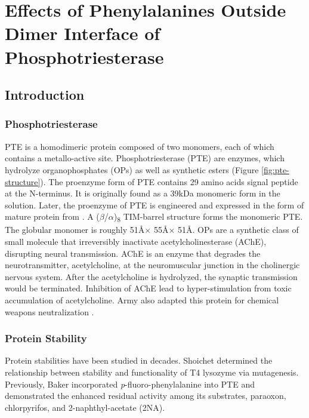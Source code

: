 \chapter{Effects of Phenylalanines Outside Dimer Interface of Phosphotriesterase}
\label{chap:dimer}
\begin{refsection}

\section{Introduction}

\subsection{Phosphotriesterase}

PTE is a homodimeric protein composed of two monomers, each of which contains a
metallo-active site. Phosphotriesterase (PTE) are enzymes, which hydrolyze
organophosphates (OPs) as well as synthetic esters (Figure
\ref{fig:pte-structure})\cite{Ghanem2005a}. The proenzyme form of PTE contains
29 amino acids signal peptide at the N-terminus. It is originally found as a
39kDa monomeric form in the solution\cite{Mulbry1989}. Later, the proenzyme of
PTE is engineered and expressed in the form of mature protein from . A ($\beta$/$\alpha$)\textsubscript{8} TIM-barrel structure forms the
monomeric PTE\cite{Roodveldt2005,Seibert2005}. The globular monomer is roughly
51\AA $\times$ 55\AA $\times$ 51\AA.  OPs are a synthetic class of small
molecule that irreversibly inactivate acetylcholinesterase (AChE), disrupting
neural transmission. AChE is an enzyme that degrades the neurotransmitter,
acetylcholine, at the neuromuscular junction in the cholinergic nervous system.
After the acetylcholine is hydrolyzed, the synaptic transmission would be
terminated. Inhibition of AChE lead to hyper-stimulation from toxic
accumulation of acetylcholine\cite{Soreq2001}. Army also adapted this protein
for chemical weapons neutralization \cite{Yang2014a}.

\subsection{Protein Stability}

Protein stabilities have been studied in decades. Shoichet 
determined the relationship between stability and functionality of T4 lysozyme
via mutagenesis\cite{Shoichet1995}. Previously, Baker 
incorporated \emph{p}-fluoro-phenylalanine into PTE and demonstrated the
enhanced residual activity among its substrates, paraoxon, chlorpyrifos, and
2-naphthyl-acetate (2NA)\cite{Baker2011b}.  


\end{refsection}
